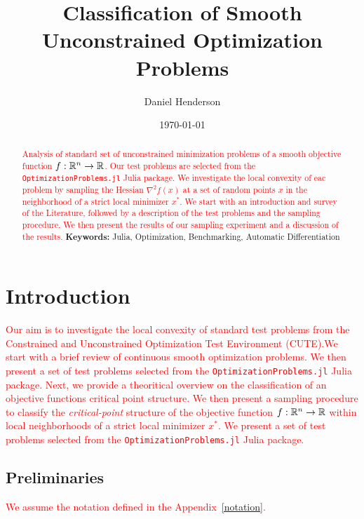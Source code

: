 \documentclass[10pt]{article}
\title{Classification of Smooth Unconstrained Optimization Problems}
\author{Daniel Henderson}
\date{\today}
\begin{document}
\maketitle

\begin{abstract}
    \noindent
    \textcolor{Red}{
    Analysis of standard set of unconstrained minimization problems
    of a smooth objective function $f: \mathbb{R}^n \rightarrow \mathbb{R}$.
    Our test problems are selected from the \texttt{OptimizationProblems.jl}
    \cite{OptimizationProblems} Julia package.
    We investigate the local convexity of eac problem by sampling
    the Hessian $\nabla^2 f(x)$ at a set of random points $x$ in
    the neighborhood of a strict local minimizer $x^*$.
    We start with an introduction and survey of the Literature,
    followed by a description of the test problems and the sampling
    procedure. We then present the results of our sampling experiment
    and a discussion of the results.
    }
    \noindent\textbf{Keywords:} Julia, Optimization, Benchmarking, Automatic Differentiation
\end{abstract}



\tableofcontents
\newpage

\section{Introduction}
    \textcolor{Red}{
    Our aim is to investigate the local convexity of standard
    test problems from the Constrained and Unconstrained Optimization Test
    Environment (CUTE).We start with a brief review of continuous
    smooth optimization problems.
    We then present a set of test problems selected from the
    \texttt{OptimizationProblems.jl} \cite{OptimizationProblems}
    Julia package. Next, we provide a theoritical overview on 
    the classification of an objective functions critical point
    structure. We then present a sampling procedure to classify
    the \emph{critical-point} structure of the objective function
    $f: \mathbb{R}^n \rightarrow \mathbb{R}$ within local neighborhoods of a strict
    local minimizer $x^*$. We present a set of test problems
    selected from the \texttt{OptimizationProblems.jl} \cite{OptimizationProblems}
    Julia package.
    }
    \medskip

    \subsection{Preliminaries}    
    \textcolor{Red}{
        We assume the notation defined in the Appendix~\ref{notation}.
    }
    \medskip
\end{document}
